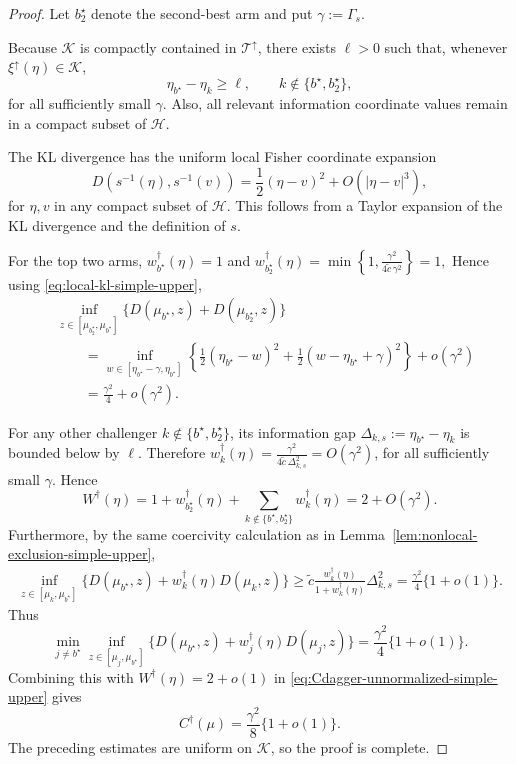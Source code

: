 \documentclass[10pt]{article}
\theoremstyle{plain}
\begin{document}
\begin{proof}
Let \(b^\star_2\) denote the second-best arm and put $\gamma:=\Gamma_s$.

Because \(\mathcal K\) is compactly contained in
\(\mathcal T^\uparrow\), there exists \(\ell>0\) such that, whenever
\(\xi^\uparrow(\eta)\in\mathcal K\),
\[
    \eta_{b^\star}-\eta_k\ge \ell,
    \qquad k\notin\{b^\star,b^\star_2\},
\]
for all sufficiently small \(\gamma\).  Also, all relevant
information coordinate values remain in a compact subset of \(\mathcal H\).

The KL divergence has the uniform local Fisher coordinate expansion
\begin{equation}
\label{eq:local-kl-simple-upper}
    D(s^{-1}(\eta),s^{-1}(v))
    =
    \frac12(\eta-v)^2+O(|\eta-v|^3),
\end{equation}
for \(\eta,v\) in any compact subset of \(\mathcal H\).  This follows from a
Taylor expansion of the KL divergence and the definition of \(s\).

For the top two arms, $w_{b^\star}^\dagger(\eta)=1$ and $w_{b^\star_2}^\dagger(\eta)
    =
    \min\left\{
        1,\frac{\gamma^2}{4\widetilde{c}\,\gamma^2}
    \right\}
    =
    1,$
Hence using
\eqref{eq:local-kl-simple-upper},
\[
\begin{aligned}
    &\inf_{z\in[\mu_{b^\star_2},\mu_{b^\star}]}
    \{D(\mu_{b^\star},z)+D(\mu_{b^\star_2},z)\}                      \\
    &\qquad=
    \inf_{w\in[\eta_{b^\star}-\gamma,\eta_{b^\star}]}
    \left\{
        \frac12(\eta_{b^\star}-w)^2
        +
        \frac12(w-\eta_{b^\star}+\gamma)^2
    \right\}
    +
    o(\gamma^2)                                             \\
    &\qquad=
    \frac{\gamma^2}{4}+o(\gamma^2).
\end{aligned}
\]

For any other challenger \(k\notin\{b^\star,b^\star_2\}\), its information gap
\(\Delta_{k,s}:=\eta_{b^\star}-\eta_k\) is bounded below by \(\ell\).  Therefore $w_k^\dagger(\eta)
    =
    \frac{\gamma^2}{4\widetilde{c}\,\Delta_{k,s}^2}
    =
    O(\gamma^2)$,
for all sufficiently small \(\gamma\).  Hence
\[
    W^\dagger(\eta)
    =
    1+w_{b^\star_2}^\dagger(\eta)+\sum_{k\notin\{b^\star,b^\star_2\}}w_k^\dagger(\eta)
    =
    2+O(\gamma^2).
\]
Furthermore, by the same coercivity calculation as in
Lemma~\ref{lem:nonlocal-exclusion-simple-upper},
\[
\begin{aligned}
    \inf_{z\in[\mu_k,\mu_{b^\star}]}
    \{D(\mu_{b^\star},z)+w_k^\dagger(\eta) D(\mu_k,z)\}
    \ge
    \widetilde{c}
    \frac{w_k^\dagger(\eta)}{1+w_k^\dagger(\eta)}
    \Delta_{k,s}^2
    =
    \frac{\gamma^2}{4}\{1+o(1)\}.
\end{aligned}
\]
Thus
\[
    \min_{j\neq b^\star}
    \inf_{z\in[\mu_j,\mu_{b^\star}]}
    \{D(\mu_{b^\star},z)+w_j^\dagger(\eta) D(\mu_j,z)\}
    =
    \frac{\gamma^2}{4}\{1+o(1)\}.
\]
Combining this with $W^\dagger(\eta)=2+o(1)$ in \eqref{eq:Cdagger-unnormalized-simple-upper} gives
\[
    C^\dagger(\mu)
    =
    \frac{\gamma^2}{8}\{1+o(1)\}.
\]
The preceding estimates are uniform on \(\mathcal K\), so the proof is complete.

\end{proof}
\end{document}
